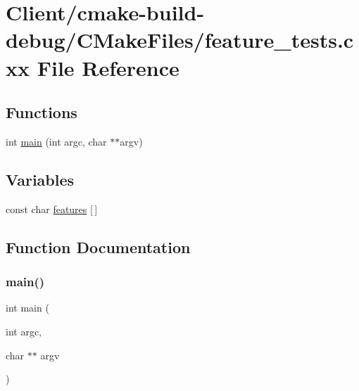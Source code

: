 \hypertarget{Client_2cmake-build-debug_2CMakeFiles_2feature__tests_8cxx}{}\section{Client/cmake-\/build-\/debug/\+C\+Make\+Files/feature\+\_\+tests.cxx File Reference}
\label{Client_2cmake-build-debug_2CMakeFiles_2feature__tests_8cxx}
\subsection*{Functions}
\begin{DoxyCompactItemize}
\item 
int \mbox{\hyperlink{Client_2cmake-build-debug_2CMakeFiles_2feature__tests_8cxx_a3c04138a5bfe5d72780bb7e82a18e627}{main}} (int argc, char $\ast$$\ast$argv)
\end{DoxyCompactItemize}
\subsection*{Variables}
\begin{DoxyCompactItemize}
\item 
const char \mbox{\hyperlink{Client_2cmake-build-debug_2CMakeFiles_2feature__tests_8cxx_a1582568e32f689337602a16bf8a5bff0}{features}} \mbox{[}$\,$\mbox{]}
\end{DoxyCompactItemize}


\subsection{Function Documentation}
\mbox{\label{Client_2cmake-build-debug_2CMakeFiles_2feature__tests_8cxx_a3c04138a5bfe5d72780bb7e82a18e627}} 
\subsubsection{\texorpdfstring{main()}{main()}}
{\footnotesize\ttfamily int main (\begin{DoxyParamCaption}\item[{int}]{argc,  }\item[{char $\ast$$\ast$}]{argv }\end{DoxyParamCaption})}



